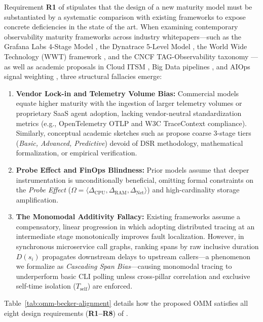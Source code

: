 Requirement \textbf{R1} of  stipulates that the design of a new maturity model must be substantiated by a systematic comparison with existing frameworks to expose concrete deficiencies in the state of the art. When examining contemporary observability maturity frameworks across industry whitepapers---such as the Grafana Labs 4-Stage Model \cite{grafana_omm_2024}, the Dynatrace 5-Level Model \cite{dynatrace_omm_2024}, the World Wide Technology (WWT) framework \cite{wwt_omm_2025}, and the CNCF TAG-Observability taxonomy \cite{cncf_obs_2024}---as well as academic proposals in Cloud ITSM \cite{duarte_2013}, Big Data pipelines \cite{patel_2025}, and AIOps signal weighting \cite{amgothu_2025}, three structural fallacies emerge:
\begin{enumerate}
    \item \textbf{Vendor Lock-in and Telemetry Volume Bias:} Commercial models equate higher maturity with the ingestion of larger telemetry volumes or proprietary SaaS agent adoption, lacking vendor-neutral standardization metrics (e.g., OpenTelemetry OTLP and W3C TraceContext compliance). Similarly, conceptual academic sketches such as  propose coarse 3-stage tiers (\textit{Basic, Advanced, Predictive}) devoid of DSR methodology, mathematical formalization, or empirical verification.
    \item \textbf{Probe Effect and FinOps Blindness:} Prior models assume that deeper instrumentation is unconditionally beneficial, omitting formal constraints on the \textit{Probe Effect} ($\Omega = \langle \Delta_{\text{CPU}}, \Delta_{\text{RAM}}, \Delta_{\text{Net}} \rangle$) and high-cardinality storage amplification.
    \item \textbf{The Monomodal Additivity Fallacy:} Existing frameworks assume a compensatory, linear progression in which adopting distributed tracing at an intermediate stage monotonically improves fault localization. However, in synchronous microservice call graphs, ranking spans by raw inclusive duration $D(s_i)$ propagates downstream delays to upstream callers---a phenomenon we formalize as \textit{Cascading Span Bias}---causing monomodal tracing to underperform basic CLI polling unless cross-pillar correlation and exclusive self-time isolation ($T_{\text{self}}$) are enforced.
\end{enumerate}

Table~\ref{tab:omm-becker-alignment} details how the proposed OMM satisfies all eight design requirements (\textbf{R1--R8}) of .

